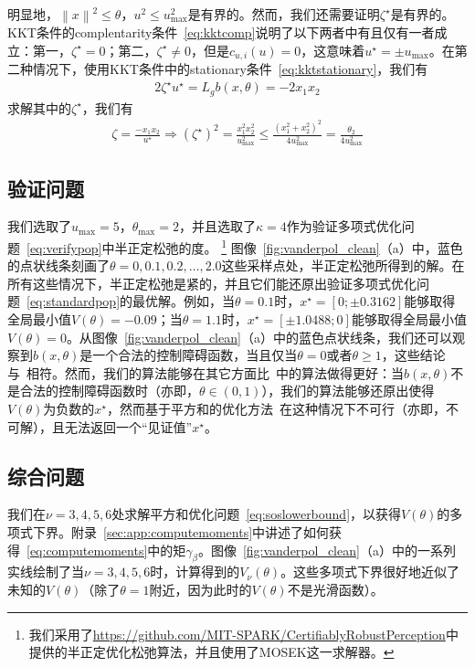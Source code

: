 明显地，$\left\lVert x \right\rVert^2 \le \theta$，$u^2 \le u_{\max}^2$是有界的。然而，我们还需要证明$\zeta^\star$是有界的。KKT条件的complentarity条件~\eqref{eq:kktcomp}说明了以下两者中有且仅有一者成立：第一，$\zeta^\star=0$；第二，$\zeta^\star \ne 0$，但是$c_{u,i}(u) = 0$，这意味着$u^\star = \pm u_{\max}$。在第二种情况下，使用KKT条件中的stationary条件~\eqref{eq:kktstationary}，我们有
\begin{eqnarray}
  2\zeta^\star u^\star = L_gb(x, \theta) = -2 x_1 x_2
\end{eqnarray}
求解其中的$\zeta^\star$，我们有
\begin{eqnarray}
  \zeta = \frac{-x_1 x_2}{u^\star} \Rightarrow 
  (\zeta^\star)^2 = \frac{x_1^2 x_2^2}{u_{\max}^2} \le \frac{
    (x_1^2 + x_2^2)^2
  }{4 u_{\max}^2} = \frac{\theta_2}{4 u_{\max}^2}
\end{eqnarray}


\subsection{验证问题}
我们选取了$u_{\max} = 5$，$\theta_{\max} = 2$，并且选取了$\kappa = 4$作为验证多项式优化问题~\eqref{eq:verifypop}中半正定松弛的度。
\footnote{
    我们采用了\url{https://github.com/MIT-SPARK/CertifiablyRobustPerception}中提供的半正定优化松弛算法，并且使用了MOSEK这一求解器。
}
图像~\ref{fig:vanderpol_clean}（a）中，蓝色的点状线条刻画了$\theta = 0, 0.1, 0.2, \dots, 2.0$这些采样点处，半正定松弛所得到的解。在所有这些情况下，半正定松弛是紧的，并且它们能还原出验证多项式优化问题~\eqref{eq:standardpop}的最优解。例如，当$\theta = 0.1$时，$x^\star = [0; \pm 0.3162]$能够取得全局最小值$V(\theta) = -0.09$；当$\theta = 1.1$时，$x^\star = [\pm 1.0488; 0]$能够取得全局最小值$V(\theta) = 0$。从图像~\ref{fig:vanderpol_clean}（a）中的蓝色点状线条，我们还可以观察到$b(x, \theta)$是一个合法的控制障碍函数，当且仅当$\theta = 0$或者$\theta \ge 1$，这些结论与~\cite{clark22arxiv-cbf}相符。然而，我们的算法能够在其它方面比~\cite{clark22arxiv-cbf}中的算法做得更好：当$b(x, \theta)$不是合法的控制障碍函数时（亦即，$\theta \in (0, 1)$），我们的算法能够还原出使得$V(\theta)$为负数的$x^\star$，然而基于平方和的优化方法~\cite{clark22arxiv-cbf}在这种情况下不可行（亦即，不可解），且无法返回一个“见证值”$x^\star$。



\subsection{综合问题}
我们在$\nu = 3, 4, 5, 6$处求解平方和优化问题~\eqref{eq:soslowerbound}，以获得$V(\theta)$的多项式下界。附录~\ref{sec:app:computemoments}中讲述了如何获得~\eqref{eq:computemoments}中的矩$\gamma_\beta$。图像~\ref{fig:vanderpol_clean}（a）中的一系列实线绘制了当$\nu = 3, 4, 5, 6$时，计算得到的$V_\nu(\theta)$。这些多项式下界很好地近似了未知的$V(\theta)$（除了$\theta = 1$附近，因为此时的$V(\theta)$不是光滑函数）。


